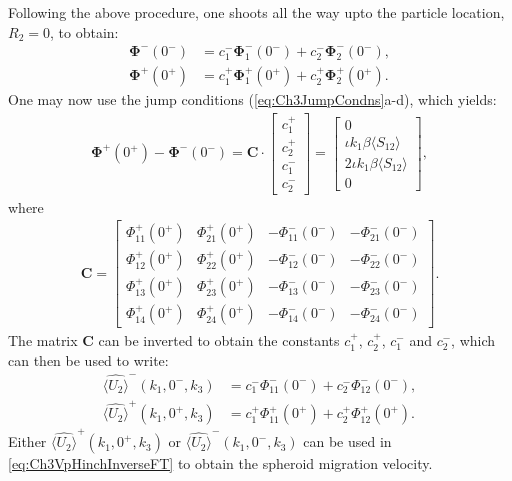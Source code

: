 \documentclass{jfm}
\begin{document}
Following the above procedure, one shoots all the way upto the particle location, $R_2=0$, to obtain: 
\begin{align} \label{eq:Ch3HinchForm7}
\bm{\Phi}^-(0^-)&=c_1^- \bm{\Phi}_1^-(0^-) + c_2^- \bm{\Phi}_2^-(0^-),\\
\bm{\Phi}^+(0^+)&=c_1^+ \bm{\Phi}_1^+(0^+) + c_2^+ \bm{\Phi}_2^+(0^+).
\end{align}
One may now use the jump conditions (\ref{eq:Ch3JumpCondns}a-d), which yields:
\begin{align}
\bm{\Phi}^+(0^+)-\bm{\Phi}^-(0^-)=\bm{C}\cdot
								  \begin{bmatrix}
								  c_1^+ \\
								  c_2^+ \\
								  c_1^- \\
								  c_2^-
								  \end{bmatrix}
								  =\begin{bmatrix}
								  0 \\
								  \iota k_1 \beta \langle S_{12}\rangle \\
								  2\iota k_1 \beta \langle S_{12}\rangle \\
								  0
								  \end{bmatrix},
\end{align}
where 
\begin{align}
\bm{C}=\begin{bmatrix}
\Phi_{11}^+(0^+) & \Phi_{21}^+(0^+) & -\Phi_{11}^-(0^-) & -\Phi_{21}^-(0^-)\\
\Phi_{12}^+(0^+) & \Phi_{22}^+(0^+) & -\Phi_{12}^-(0^-) & -\Phi_{22}^-(0^-) \\
\Phi_{13}^+(0^+) & \Phi_{23}^+(0^+) & -\Phi_{13}^-(0^-) & -\Phi_{23}^-(0^-) \\
\Phi_{14}^+(0^+) & \Phi_{24}^+(0^+) & -\Phi_{14}^-(0^-) & -\Phi_{24}^-(0^-)
\end{bmatrix}.
\end{align}
The matrix $\bm{C}$ can be inverted to obtain the constants $c_1^+$, $c_2^+$, $c_1^-$ and $c_2^-$, which can then be used to write:
\begin{align}
\hat{\langle U_2\rangle}^{-}(k_1,0^-,k_3)&= c_1^-\Phi_{11}^-(0^-)+ c_2^-\Phi_{12}^-(0^-),\\
\hat{\langle U_2\rangle}^{+}(k_1,0^+,k_3)&= c_1^+\Phi_{11}^+(0^+)+ c_2^+\Phi_{12}^+(0^+).
\end{align}
Either $\hat{\langle U_2\rangle}^{+}(k_1,0^+,k_3)$ or $\hat{\langle U_2\rangle}^{-}(k_1,0^-,k_3)$ can be used in \eqref{eq:Ch3VpHinchInverseFT} to obtain the spheroid migration velocity.



\end{document}
